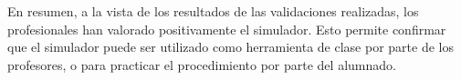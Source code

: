 



En resumen, a la vista de los resultados de las validaciones realizadas, los profesionales han valorado positivamente el simulador. Esto permite confirmar que el simulador puede ser utilizado como herramienta de clase por parte de los profesores, o para practicar el procedimiento por parte del alumnado. 
